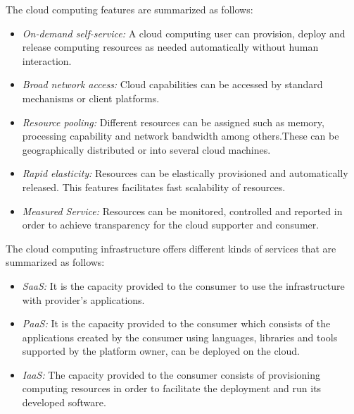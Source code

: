 The  cloud computing features are summarized as follows:
\begin{itemize}
\item \emph{On-demand self-service:} A cloud computing user can provision,
  deploy and release computing resources as needed automatically without human
  interaction.
\item \emph{Broad network access:} Cloud capabilities can be accessed by
  standard mechanisms or client platforms.
\item \emph{Resource pooling:} Different resources can be assigned such as memory,
  processing capability and network bandwidth among others.These can be
  geographically distributed or into several cloud machines.
\item \emph{Rapid elasticity:} Resources can be elastically provisioned and
  automatically released. This features facilitates fast scalability of resources.
\item \emph{Measured Service:} Resources can be monitored, controlled and
  reported in order to achieve transparency for the cloud supporter and consumer.
\end{itemize}

The cloud computing infrastructure offers different kinds of services that are
summarized as follows:

\begin{itemize}
\item \emph{\ac{SaaS}:} It is the capacity provided to the consumer
  to use  the infrastructure with provider's applications.
\item \emph{\ac{PaaS}:} It is the capacity provided to the consumer which
  consists of the  applications created by the consumer using languages, libraries
  and tools supported by the platform owner, can be deployed on the cloud.
\item \emph{\ac{IaaS}:} The capacity provided to the
  consumer consists of provisioning computing resources in order to facilitate
  the deployment and run its developed software.
\end{itemize}



